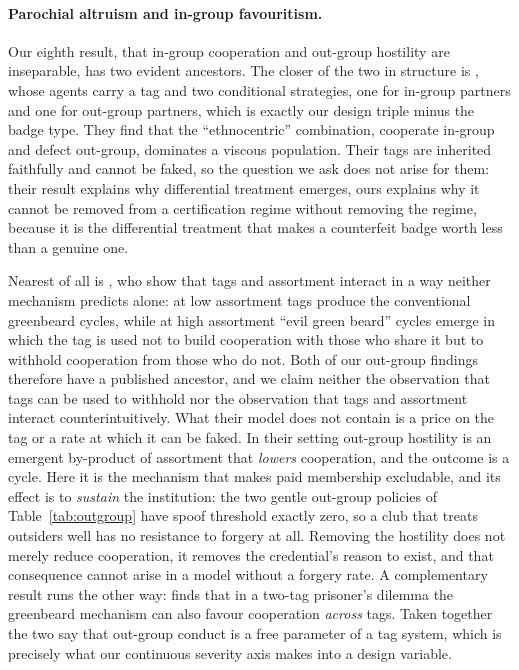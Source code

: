 \documentclass[11pt,a4paper]{article}
\theoremstyle{definition}
\begin{document}
\paragraph{Parochial altruism and in-group favouritism.}
Our eighth result, that in-group cooperation and out-group hostility are
inseparable, has two evident ancestors. The closer of the two in structure is
\citet{hammond2006ethnocentrism}, whose agents carry a tag and two conditional
strategies, one for in-group partners and one for out-group partners, which is
exactly our design triple minus the badge type. They find that the
``ethnocentric'' combination, cooperate in-group and defect out-group,
dominates a viscous population. Their tags are inherited faithfully and cannot
be faked, so the question we ask does not arise for them: their result explains
why differential treatment emerges, ours explains why it cannot be removed from
a certification regime without removing the regime, because it is the
differential treatment that makes a counterfeit badge worth less than a genuine
one.

Nearest of all is \citet{garcia2014evilbeards}, who show that tags and
assortment interact in a way neither mechanism predicts alone: at low
assortment tags produce the conventional greenbeard cycles, while at high
assortment ``evil green beard'' cycles emerge in which the tag is used not to
build cooperation with those who share it but to withhold cooperation from
those who do not. Both of our out-group findings therefore have a published
ancestor, and we claim neither the observation that tags can be used to
withhold nor the observation that tags and assortment interact
counterintuitively. What their model does not contain is a price on the tag or
a rate at which it can be faked. In their setting out-group hostility is an
emergent by-product of assortment that \emph{lowers} cooperation, and the
outcome is a cycle. Here it is the mechanism that makes paid membership
excludable, and its effect is to \emph{sustain} the institution: the two gentle
out-group policies of Table~\ref{tab:outgroup} have spoof threshold exactly
zero, so a club that treats outsiders well has no resistance to forgery at all.
Removing the hostility does not merely reduce cooperation, it removes the
credential's reason to exist, and that consequence cannot arise in a model
without a forgery rate. A complementary result runs the other
way: \citet{laird2011traitorousness} finds that in a two-tag prisoner's dilemma
the greenbeard mechanism can also favour cooperation \emph{across} tags. Taken
together the two say that out-group conduct is a free parameter of a tag
system, which is precisely what our continuous severity axis makes into a
design variable.
\end{document}
